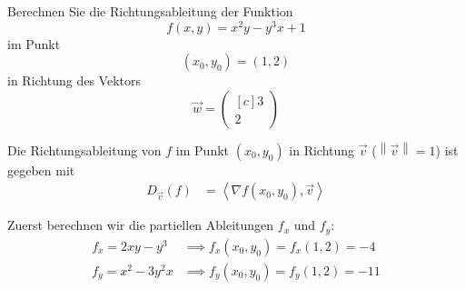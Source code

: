 \documentclass[answers]{exam}
\newcommand{\norm}[1]{\left\| #1 \right\|}
\newcommand{\scalarprod}[1]{\left\langle #1 \right\rangle}
\newcommand{\vektor}[1]{\begin{pmatrix*}[c] #1 \end{pmatrix*}}
\newcommand{\R}{\mathbb{R}}
\begin{document}
\begin{questions}

    \newpage

    \question
    Berechnen Sie die Richtungsableitung der Funktion
    $$
        f(x, y) = x^2y - y^3x + 1
    $$
    im Punkt
    $$
        (x_0, y_0) = (1, 2)
    $$
    in Richtung des Vektors
    $$
        \vec{w} = \vektor{3 \\ 2}
    $$
    \begin{solution}
        Die Richtungsableitung von $f$ im Punkt $(x_0, y_0)$ in Richtung $\vec{v}$ ($\norm{\vec{v}} = 1$) ist gegeben mit
        $$
            \begin{aligned}
                D_{\vec{v}}(f) & = \scalarprod{\nabla f(x_0, y_0), \vec{v}}
            \end{aligned}
        $$

        Zuerst berechnen wir die partiellen Ableitungen $f_x$ und $f_y$:
        $$
            \begin{aligned}
                f_x = 2xy - y^3   & \implies f_x(x_0, y_0) = f_x(1, 2) = -4  \\
                f_y = x^2 - 3y^2x & \implies f_y(x_0, y_0) = f_y(1, 2) = -11
            \end{aligned}
        $$


\end{solution}
\end{questions}
\end{document}
